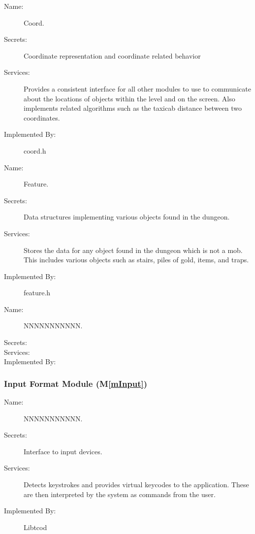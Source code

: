\documentclass[12pt, titlepage]{article}
\newcommand{\mref}[1]{M\ref{#1}}
\begin{document}
		\bigskip\begin{description}
			\item[Name:]Coord.
			\item[Secrets:]Coordinate representation and coordinate related behavior
			\item[Services:]Provides a consistent interface for all other modules to use to communicate about the locations of objects within the level and on the screen. Also implements related algorithms such as the taxicab distance between two coordinates.
			\item[Implemented By:]coord.h
		\end{description}

		\bigskip\begin{description}
			\item[Name:]Feature.
			\item[Secrets:]Data structures implementing various objects found in the dungeon.
			\item[Services:]Stores the data for any object found in the dungeon which is not a mob. This includes various objects such as stairs, piles of gold, items, and traps.
			\item[Implemented By:]feature.h
		\end{description}

		\bigskip\begin{description}
			\item[Name:]NNNNNNNNNNN.
			\item[Secrets:]
			\item[Services:]
			\item[Implemented By:]
		\end{description}

	\subsubsection{Input Format Module (\mref{mInput})}

		\bigskip\begin{description}
			\item[Name:]NNNNNNNNNNN.
			\item[Secrets:]Interface to input devices.
			\item[Services:]Detects keystrokes and provides virtual keycodes to the application. These are then interpreted by the system as commands from the user.
			\item[Implemented By:] Libtcod
		\end{description}
\end{document}
